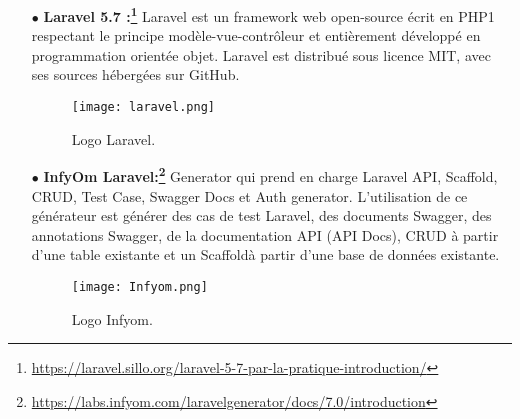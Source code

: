 \begin{itemize}
	\item[$\bullet$] \textbf{ Laravel 5.7 :\footnote{ \url{https://laravel.sillo.org/laravel-5-7-par-la-pratique-introduction/} }} 
Laravel est un framework web open-source écrit en PHP1 respectant le principe modèle-vue-contrôleur et entièrement développé en programmation orientée objet. Laravel est distribué sous licence MIT, avec ses sources hébergées sur GitHub.

\cite{wiki:Laravel}
\begin{figure}[ht]
	\centering
	\texttt{[image: laravel.png]}
	\caption{Logo Laravel.}
	\label{fig:Laravel }
\end{figure}
\FloatBarrier

\medskip

	\item[$\bullet$] \textbf{ InfyOm Laravel:\footnote{ \url{https://labs.infyom.com/laravelgenerator/docs/7.0/introduction} }} 
 Generator qui prend 
en charge Laravel API, Scaffold, CRUD,
Test Case, Swagger Docs et Auth generator.
L'utilisation de ce générateur est  générer des cas de test Laravel, 
des documents Swagger, des annotations Swagger, de la documentation API (API Docs), CRUD à partir d'une table existante et un Scaffoldà partir d'une base de données existante.
\cite{wiki:Laravel}
\begin{figure}[ht]
	\centering
	\texttt{[image: Infyom.png]}
	\caption{Logo Infyom.}
	\label{fig:Infyom }
\end{figure}
\FloatBarrier

\medskip


\end{itemize}
